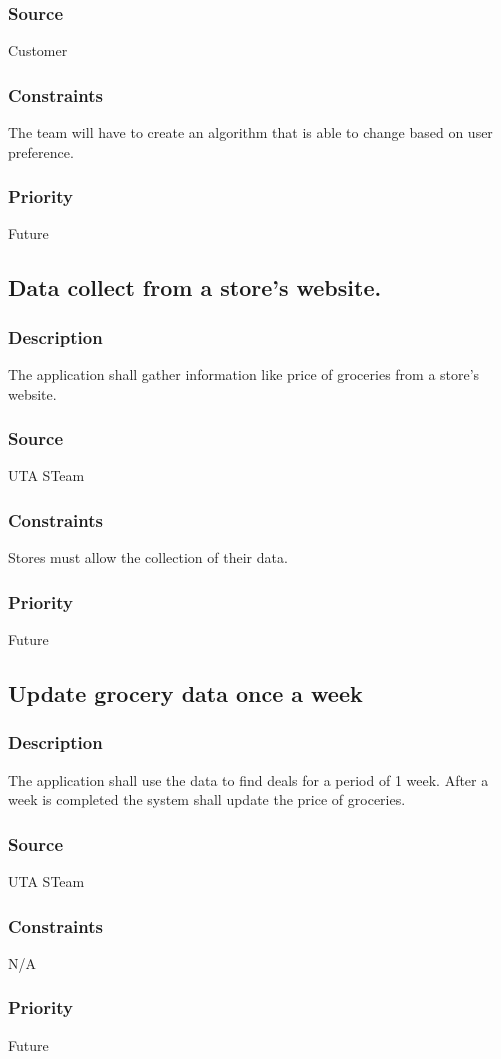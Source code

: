 \subsubsection{Source}
Customer
\subsubsection{Constraints}
The team will have to create an algorithm that is able to change based on user preference.
\subsubsection{Priority}
Future

\subsection{Data collect from a store's website.}
\subsubsection{Description}
The application shall gather information like price of groceries from a store's website.  
\subsubsection{Source}
UTA STeam
\subsubsection{Constraints}
Stores must allow the collection of their data.
\subsubsection{Priority}
Future

\subsection{Update grocery data once a week}
\subsubsection{Description}
The application shall use the data to find deals for a period of 1 week. After a week is completed the system shall update the price of groceries.  
\subsubsection{Source}
UTA STeam
\subsubsection{Constraints}
N/A
\subsubsection{Priority}
Future